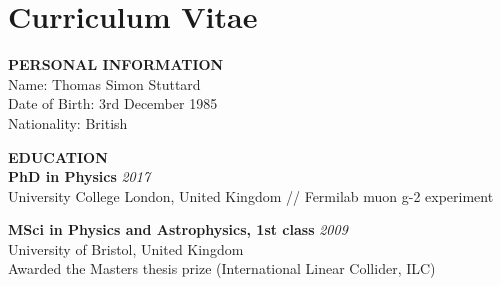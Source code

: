 \documentclass[a4paper,11pt]{article}
\renewcommand{\smallskip} {\vspace{0.1in}}
\begin{document}


\newpage




\newpage

\section{Curriculum Vitae}


\textbf{PERSONAL INFORMATION ~~\hrulefill}\smallskip\\
Name: Thomas Simon Stuttard \\
Date of Birth: 3rd December 1985\\
Nationality: British

%
\textbf{EDUCATION ~~\hrulefill}\smallskip\\
%
{\bf PhD in Physics} \hfill {\em 2017} \\ 
University College London, United Kingdom // Fermilab muon g-2 experiment

{\bf MSci in Physics and Astrophysics, 1st class} \hfill {\em 2009} \\ 
University of Bristol, United Kingdom \\
Awarded the Masters thesis prize (International Linear Collider, ILC)
\end{document}

